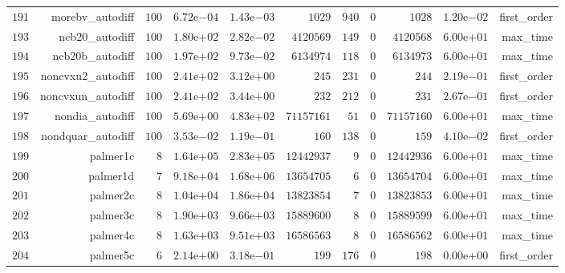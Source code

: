 \documentclass[varwidth=20cm,crop=true]{standalone}
\begin{document}
\begin{longtable}{rrrrrrrrrrr}
  \(   191\) & morebv\_autodiff & \(   100\) & \( 6.72\)e\(-04\) & \( 1.43\)e\(-03\) & \(  1029\) & \(   940\) & \(     0\) & \(  1028\) & \( 1.20\)e\(-02\) & first\_order \\
  \(   193\) & ncb20\_autodiff & \(   100\) & \( 1.80\)e\(+02\) & \( 2.82\)e\(-02\) & \(4120569\) & \(   149\) & \(     0\) & \(4120568\) & \( 6.00\)e\(+01\) & max\_time \\
  \(   194\) & ncb20b\_autodiff & \(   100\) & \( 1.97\)e\(+02\) & \( 9.73\)e\(-02\) & \(6134974\) & \(   118\) & \(     0\) & \(6134973\) & \( 6.00\)e\(+01\) & max\_time \\
  \(   195\) & noncvxu2\_autodiff & \(   100\) & \( 2.41\)e\(+02\) & \( 3.12\)e\(+00\) & \(   245\) & \(   231\) & \(     0\) & \(   244\) & \( 2.19\)e\(-01\) & first\_order \\
  \(   196\) & noncvxun\_autodiff & \(   100\) & \( 2.41\)e\(+02\) & \( 3.44\)e\(+00\) & \(   232\) & \(   212\) & \(     0\) & \(   231\) & \( 2.67\)e\(-01\) & first\_order \\
  \(   197\) & nondia\_autodiff & \(   100\) & \( 5.69\)e\(+00\) & \( 4.83\)e\(+02\) & \(71157161\) & \(    51\) & \(     0\) & \(71157160\) & \( 6.00\)e\(+01\) & max\_time \\
  \(   198\) & nondquar\_autodiff & \(   100\) & \( 3.53\)e\(-02\) & \( 1.19\)e\(-01\) & \(   160\) & \(   138\) & \(     0\) & \(   159\) & \( 4.10\)e\(-02\) & first\_order \\
  \(   199\) & palmer1c & \(     8\) & \( 1.64\)e\(+05\) & \( 2.83\)e\(+05\) & \(12442937\) & \(     9\) & \(     0\) & \(12442936\) & \( 6.00\)e\(+01\) & max\_time \\
  \(   200\) & palmer1d & \(     7\) & \( 9.18\)e\(+04\) & \( 1.68\)e\(+06\) & \(13654705\) & \(     6\) & \(     0\) & \(13654704\) & \( 6.00\)e\(+01\) & max\_time \\
  \(   201\) & palmer2c & \(     8\) & \( 1.04\)e\(+04\) & \( 1.86\)e\(+04\) & \(13823854\) & \(     7\) & \(     0\) & \(13823853\) & \( 6.00\)e\(+01\) & max\_time \\
  \(   202\) & palmer3c & \(     8\) & \( 1.90\)e\(+03\) & \( 9.66\)e\(+03\) & \(15889600\) & \(     8\) & \(     0\) & \(15889599\) & \( 6.00\)e\(+01\) & max\_time \\
  \(   203\) & palmer4c & \(     8\) & \( 1.63\)e\(+03\) & \( 9.51\)e\(+03\) & \(16586563\) & \(     8\) & \(     0\) & \(16586562\) & \( 6.00\)e\(+01\) & max\_time \\
  \(   204\) & palmer5c & \(     6\) & \( 2.14\)e\(+00\) & \( 3.18\)e\(-01\) & \(   199\) & \(   176\) & \(     0\) & \(   198\) & \( 0.00\)e\(+00\) & first\_order \\

\end{longtable}
\end{document}
